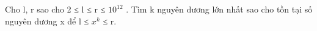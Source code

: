 Cho l, r sao cho 2 ≤ l ≤ r ≤ $10^{12}$   . Tìm k nguyên dương lớn nhất sao cho tồn tại số nguyên dương x để l ≤ $x^{k}$   ≤ r.